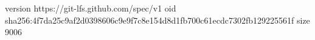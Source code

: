 version https://git-lfs.github.com/spec/v1
oid sha256:4f7da25c9af2d0398606c9e9f7c8e154d8d1fb700c61ecdc7302fb129225561f
size 9006
